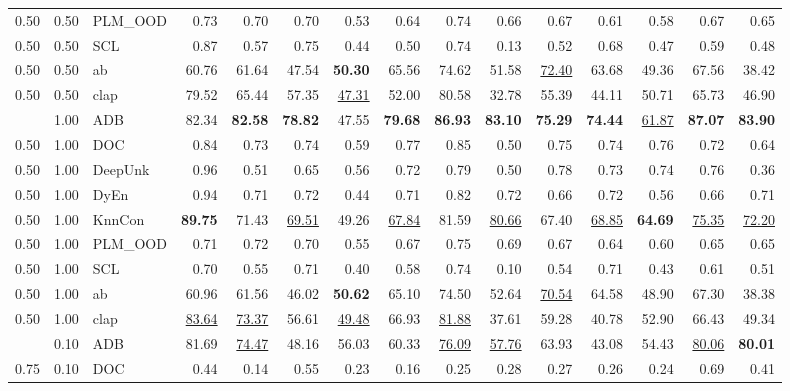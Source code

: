 \begin{table}[t]
{\begin{tabular}{lllrrrrrrrrrrrr}
0.50 & 0.50 & PLM_OOD & 0.73 & 0.70 & 0.70 & 0.53 & 0.64 & 0.74 & 0.66 & 0.67 & 0.61 & 0.58 & 0.67 & 0.65 \\
0.50 & 0.50 & SCL & 0.87 & 0.57 & 0.75 & 0.44 & 0.50 & 0.74 & 0.13 & 0.52 & 0.68 & 0.47 & 0.59 & 0.48 \\
0.50 & 0.50 & ab & 60.76 & 61.64 & 47.54 & \textbf{50.30} & 65.56 & 74.62 & 51.58 & \underline{72.40} & 63.68 & 49.36 & 67.56 & 38.42 \\
0.50 & 0.50 & clap & 79.52 & 65.44 & 57.35 & \underline{47.31} & 52.00 & 80.58 & 32.78 & 55.39 & 44.11 & 50.71 & 65.73 & 46.90 \\
\addlinespace
0.50 & 1.00 & ADB & 82.34 & \textbf{82.58} & \textbf{78.82} & 47.55 & \textbf{79.68} & \textbf{86.93} & \textbf{83.10} & \textbf{75.29} & \textbf{74.44} & \underline{61.87} & \textbf{87.07} & \textbf{83.90} \\
0.50 & 1.00 & DOC & 0.84 & 0.73 & 0.74 & 0.59 & 0.77 & 0.85 & 0.50 & 0.75 & 0.74 & 0.76 & 0.72 & 0.64 \\
0.50 & 1.00 & DeepUnk & 0.96 & 0.51 & 0.65 & 0.56 & 0.72 & 0.79 & 0.50 & 0.78 & 0.73 & 0.74 & 0.76 & 0.36 \\
0.50 & 1.00 & DyEn & 0.94 & 0.71 & 0.72 & 0.44 & 0.71 & 0.82 & 0.72 & 0.66 & 0.72 & 0.56 & 0.66 & 0.71 \\
0.50 & 1.00 & KnnCon & \textbf{89.75} & 71.43 & \underline{69.51} & 49.26 & \underline{67.84} & 81.59 & \underline{80.66} & 67.40 & \underline{68.85} & \textbf{64.69} & \underline{75.35} & \underline{72.20} \\
0.50 & 1.00 & PLM_OOD & 0.71 & 0.72 & 0.70 & 0.55 & 0.67 & 0.75 & 0.69 & 0.67 & 0.64 & 0.60 & 0.65 & 0.65 \\
0.50 & 1.00 & SCL & 0.70 & 0.55 & 0.71 & 0.40 & 0.58 & 0.74 & 0.10 & 0.54 & 0.71 & 0.43 & 0.61 & 0.51 \\
0.50 & 1.00 & ab & 60.96 & 61.56 & 46.02 & \textbf{50.62} & 65.10 & 74.50 & 52.64 & \underline{70.54} & 64.58 & 48.90 & 67.30 & 38.38 \\
0.50 & 1.00 & clap & \underline{83.64} & \underline{73.37} & 56.61 & \underline{49.48} & 66.93 & \underline{81.88} & 37.61 & 59.28 & 40.78 & 52.90 & 66.43 & 49.34 \\
\addlinespace
0.75 & 0.10 & ADB & 81.69 & \underline{74.47} & 48.16 & 56.03 & 60.33 & \underline{76.09} & \underline{57.76} & 63.93 & 43.08 & 54.43 & \underline{80.06} & \textbf{80.01} \\
0.75 & 0.10 & DOC & 0.44 & 0.14 & 0.55 & 0.23 & 0.16 & 0.25 & 0.28 & 0.27 & 0.26 & 0.24 & 0.69 & 0.41 \\

\end{tabular}}
\end{table}
